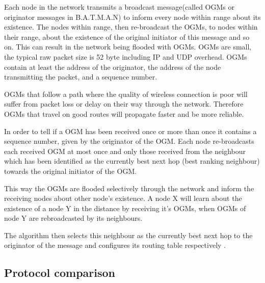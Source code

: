 Each node in the network transmits a broadcast message(called OGMs or originator messages in B.A.T.M.A.N) to inform every node within range about its existence.
The nodes within range, then re-broadcast the OGMs, to nodes within their range, about the existence of the original initiator of this message and so on.
This can result in the network being flooded with OGMs.
OGMs are small, the typical raw packet size is 52 byte including IP and UDP overhead\cite{BATMAN}.
OGMs contain at least the address of the originator, the address of the node transmitting the packet, and a sequence number.

OGMs that follow a path where the quality of wireless connection is poor will suffer from packet loss or delay on their way through the network.
Therefore OGMs that travel on good routes will propagate faster and be more reliable\cite{BATMAN}.

In order to tell if a OGM has been received once or more than once it contains a sequence number, given by the originator of the OGM.
Each node re-broadcasts each received OGM at most once and only those received from the neighbour which has been identified as the currently best next hop (best ranking neighbour) towards the original initiator of the OGM.

This way the OGMs are flooded selectively through the network and inform the receiving nodes about other node's existence. 
A node X will learn about the existence of a node Y in the distance by receiving it's OGMs, when OGMs of node Y are rebroadcasted by its neighbours.

The algorithm then selects this neighbour as the currently best next hop to the originator of the message and configures its routing table respectively \cite{BATMAN}.

\subsection{Protocol comparison}

